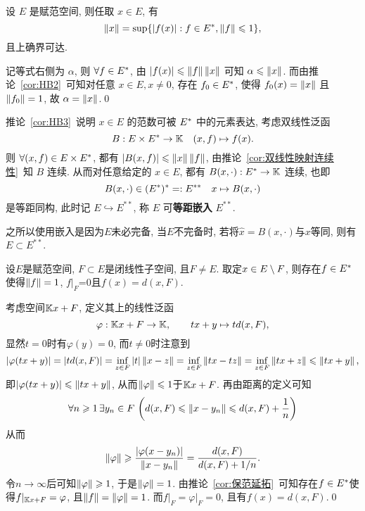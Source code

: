 	\begin{Corollary}\label{cor:HB3}
		设 $ E $ 是赋范空间, 则任取 $ x\in E $, 有
		\[
			\left\| x \right\|=\sup\{ \left| f(x) \right| :f\in E^{*}, \left\| f \right\|\leqslant1 \},
		\]
		且上确界可达.
	\end{Corollary}
	\begin{Proof}
		记等式右侧为 $ \alpha $, 则 $ \forall f\in E^{*} $, 由 $ \left| f(x) \right| \leqslant\left\| f \right\|\left\| x \right\| $ 可知 $ \alpha \leqslant\left\| x \right\| $. 而由推论~\ref{cor:HB2}~可知对任意 $ x\in E, x\ne 0 $, 存在 $ f_{0}\in E^{*} $, 使得 $ f_{0}(x)=\left\| x \right\| $ 且 $ \left\| f_{0} \right\|=1 $, 故 $ \alpha =\left\| x \right\| $.\qed
	\end{Proof}
	推论~\ref{cor:HB3}~说明 $ x\in E $ 的范数可被 $ E^{*} $ 中的元素表达, 考虑双线性泛函
	\[
		B:E\times E^{*}\to\mathbb{K}\quad(x, f)\mapsto f(x).
	\]
	则 $ \forall(x, f)\in E\times E^{*} $, 都有 $ \left| B(x, f) \right| \leqslant\left\| x \right\|\left\| f \right\| $, 由推论~\ref{cor:双线性映射连续性}~知 $ B $ 连续. 从而对任意给定的 $ x\in E $, 都有 $ B(x, \cdot):E^{*}\to\mathbb{K} $ 连续, 也即
	\[
		B(x,\cdot)\in(E^{*})^{*}=: E^{**}\quad x\mapsto B(x, \cdot)
	\]
	是等距同构, 此时记 $ E\hookrightarrow E^{**} $, 称 $ E $ 可\textbf{等距嵌入} $ E^{**} $.
	
	之所以使用嵌入是因为$ E $未必完备, 当$ E $不完备时, 若将$ \hat{x}=B(x,\cdot) $与$ x $等同, 则有$ E\subset E^{**} $.
	
	\begin{Corollary}\label{cor:HB4}
	设$ E $是赋范空间, $ F\subset E $是闭线性子空间, 且$ F\ne E $. 取定$ x\in E\setminus F $, 则存在$ f\in E^{*} $使得$ \left\| f \right\|=1 $, $ f\rvert_F $=0且$ f(x)=d(x,F) $.
	\end{Corollary}
	\begin{Proof}
	考虑空间$ \mathbb{K} x+F $, 定义其上的线性泛函
	\[
	\varphi : \mathbb{K} x+F\to\mathbb{K},\qquad tx+y\mapsto td(x,F),
	\]
	显然$ t=0 $时有$ \varphi(y)=0 $, 而$ t\ne 0 $时注意到
	\[
	\left| \varphi(tx+y) \right| =\left| td(x,F) \right| =\inf_{z\in F}\left| t \right| \left\| x-z \right\|=\inf_{z\in F}\left\| tx-tz \right\|=\inf_{z\in F}\left\| tx+z \right\|\leqslant\left\| tx+y \right\|,
	\]
	即$ \left| \varphi(tx+y) \right| \leqslant\left\| tx+y \right\| $, 从而$ \left\| \varphi \right\|\leqslant 1 $于$ \mathbb{K} x+F $. 再由距离的定义可知
	\[
	\forall n\geqslant 1\,\exists y_n\in F\,\left(d(x,F)\leqslant\left\| x-y_n \right\|\leqslant d(x,F)+\frac{1}{n}\right)
	\]
	从而
	\[
	\left\| \varphi \right\|\geqslant\frac{\left| \varphi(x-y_n) \right| }{\left\| x-y_n \right\|}=\frac{d(x,F)}{d(x,F)+1/n}.
	\]
	令$ n\to\infty $后可知$ \left\| \varphi \right\|\geqslant 1 $, 于是$ \left\| \varphi \right\|=1 $. 由推论~\ref{cor:保范延拓}~可知存在$ f\in E^{*} $使得$ f\rvert_{\mathbb{K} x+F}=\varphi $, 且$ \left\| f \right\|=\left\| \varphi \right\|=1 $. 而$ f\rvert_F=\varphi\rvert_F=0 $, 且有$ f(x)=d(x,F) $.\qed
	\end{Proof}
	
